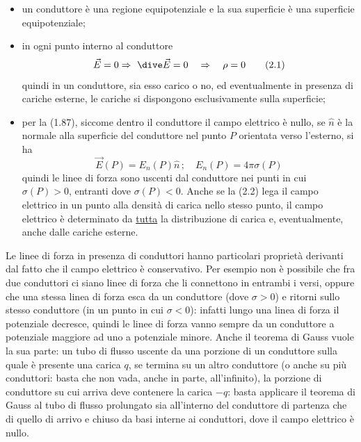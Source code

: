 \begin{itemize}
  \item[i)] un conduttore \`e una regione equipotenziale e la sua superficie \`e
    una superficie equipotenziale;
  \item[ii)] in ogni punto interno al conduttore
    \begin{equation}
      \vec E=0\Rightarrow\ \dive\vec E=0\quad\Rightarrow\quad\rho=0
      \tag{2.1}
    \end{equation}
    quindi in un conduttore, sia esso carico o no, ed eventualmente in presenza
    di cariche esterne, le cariche si dispongono esclusivamente sulla
    superficie;
  \item[iii)] per la (1.87), siccome dentro il conduttore il campo elettrico \`e
    nullo, se $\hat n$ \`e la normale alla superficie del conduttore nel punto
    $P$ orientata verso l'esterno, si ha
    \begin{equation}
      \vec E(P)=E_n(P)\hat n\,;\quad E_n(P)=4\pi\sigma(P)
      \tag{2.2}
    \end{equation}
    quindi le linee di forza sono uscenti dal conduttore nei punti in cui
    $\sigma(P)>0$, entranti dove $\sigma(P)<0$. Anche se la (2.2) lega il campo
    elettrico in un punto alla densit\`a di carica nello stesso punto, il campo
    elettrico \`e determinato da \underline{tutta} la distribuzione di carica e,
    eventualmente, anche dalle cariche esterne.
\end{itemize}
Le linee di forza in presenza di conduttori hanno particolari propriet\`a
derivanti dal fatto che il campo elettrico \`e conservativo. Per esempio non \`e
possibile che fra due conduttori ci siano linee di forza che li connettono in
entrambi i versi, oppure che una stessa linea di forza esca da un conduttore
(dove $\sigma>0$) e ritorni sullo stesso conduttore (in un punto in cui
$\sigma<0$): infatti lungo una linea di forza il potenziale decresce, quindi le
linee di forza vanno sempre da un conduttore a potenziale maggiore ad uno a
potenziale minore. Anche il teorema di Gauss vuole la sua parte: un tubo di
flusso uscente da una porzione di un conduttore sulla quale \`e presente una
carica $q$, se termina su un altro conduttore (o anche su pi\`u conduttori:
basta che non vada, anche in parte, all'infinito), la porzione di conduttore su
cui arriva deve contenere la carica $-q$: basta applicare il teorema di Gauss al
tubo di flusso prolungato sia all'interno del conduttore di partenza che di
quello di arrivo e chiuso da basi interne ai conduttori, dove il campo elettrico
\`e nullo.


